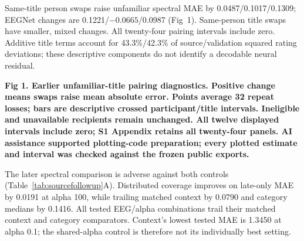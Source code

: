 \documentclass[10pt,letterpaper]{article}
\begin{document}
Same-title person swaps raise unfamiliar spectral MAE by 0.0487/0.1017/0.1309; EEGNet changes are 0.1221/\(-0.0665\)/0.0987 (Fig~1). Same-person title swaps have smaller, mixed changes. All twenty-four pairing intervals include zero. Additive title terms account for 43.3\%/42.3\% of source/validation squared rating deviations; these descriptive components do not identify a decodable neural residual.

\par\medskip\begin{samepage}\noindent
\textbf{Fig 1. Earlier unfamiliar-title pairing diagnostics. Positive change means swaps raise mean absolute error. Points average 32 repeat losses; bars are descriptive crossed participant/title intervals. Ineligible and unavailable recipients remain unchanged. All twelve displayed intervals include zero; S1 Appendix retains all twenty-four panels. AI assistance supported plotting-code preparation; every plotted estimate and interval was checked against the frozen public exports.}\label{fig:pairing}
\par\end{samepage}\medskip




The later spectral comparison is adverse against both controls (Table~\ref{tab:sourcefollowup}A). Distributed coverage improves on late-only MAE by 0.0191 at alpha 100, while trailing matched context by 0.0790 and category medians by 0.1416. All tested EEG/alpha combinations trail their matched context and category comparators. Context's lowest tested MAE is 1.3450 at alpha 0.1; the shared-alpha control is therefore not its individually best setting.
\end{document}
